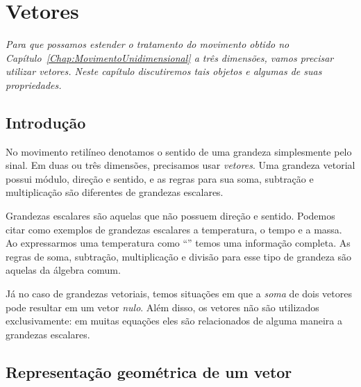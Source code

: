 \chapter{Vetores}
\label{Chap:Vetores}


\begin{fullwidth}
{\it
Para que possamos estender o tratamento do movimento obtido no Capítulo~\ref{Chap:MovimentoUnidimensional} a três dimensões, vamos precisar utilizar vetores. Neste capítulo discutiremos tais objetos e algumas de suas propriedades.
}
\end{fullwidth}

\section{Introdução}

No movimento retilíneo denotamos o sentido de uma grandeza simplesmente pelo sinal. Em duas ou três dimensões, precisamos usar \emph{vetores}. Uma grandeza vetorial possui módulo, direção e sentido, e as regras para sua soma, subtração e multiplicação são diferentes de grandezas escalares.

Grandezas escalares são aquelas que não possuem direção e sentido. Podemos citar como exemplos de grandezas escalares a temperatura, o tempo e a massa. Ao expressarmos uma temperatura como ``'' temos uma informação completa. As regras de soma, subtração, multiplicação e divisão para esse tipo de grandeza são aquelas da álgebra comum.

Já no caso de grandezas vetoriais, temos situações em que a \emph{soma} de dois vetores pode resultar em um vetor \emph{nulo}. Além disso, os vetores não são utilizados exclusivamente: em muitas equações eles são relacionados de alguma maneira a grandezas escalares.

\section{Representação geométrica de um vetor}

